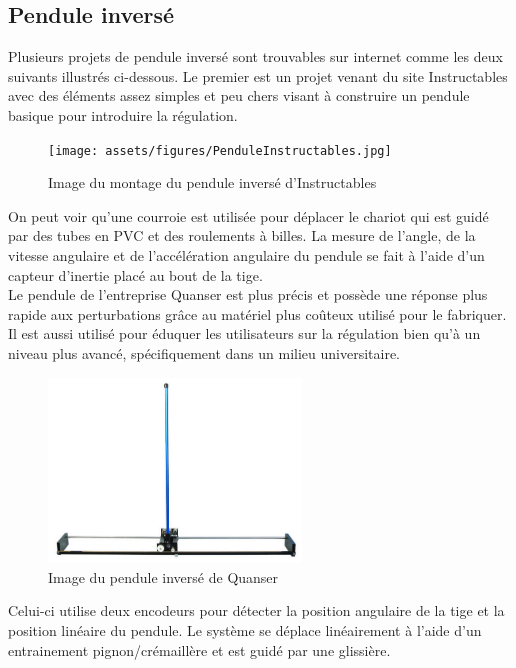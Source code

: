 \subsection{Pendule inversé}

Plusieurs projets de pendule inversé sont trouvables sur internet comme les deux suivants illustrés ci-dessous.
Le premier est un projet venant du site Instructables avec des éléments assez simples et peu chers visant à construire un pendule basique
pour introduire la régulation.

\begin{figure}[H]
  \centering
  \texttt{[image: assets/figures/PenduleInstructables.jpg]}
  \caption{Image du montage du pendule inversé d'Instructables \cite{Instructables}}
  \label{fig:Instructables}
\end{figure}

On peut voir qu'une courroie est utilisée pour déplacer le chariot qui est guidé par des tubes en PVC et des roulements à billes. La mesure de l'angle, de la vitesse angulaire et de l'accélération angulaire du pendule se fait à l'aide d'un capteur d'inertie placé au bout de la tige.\\

Le pendule de l'entreprise Quanser est plus précis et possède une réponse plus rapide aux perturbations grâce au matériel plus coûteux utilisé pour le fabriquer. Il est aussi utilisé pour éduquer les utilisateurs sur la régulation bien qu'à un niveau plus avancé, spécifiquement dans un milieu universitaire.

\begin{figure}[H]
  \centering
  \includegraphics[width = 0.6\textwidth]{assets/figures/PenduleQuanser.png}
  \caption{Image du pendule inversé de Quanser \cite{Quanser}}
  \label{fig:Quanser}
\end{figure}

Celui-ci utilise deux encodeurs pour détecter la position angulaire de la tige et la position linéaire du pendule. Le système se déplace linéairement à l'aide d'un entrainement pignon/crémaillère et est guidé par une glissière.